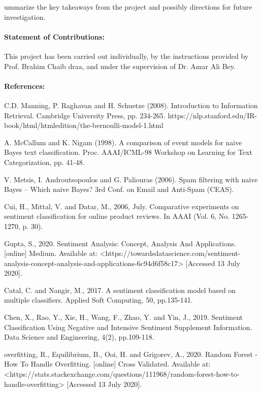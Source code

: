 \documentclass[12pt]{report}
\begin{document}
	
	
	
	ummarize the key takeaways from the project
	and possibly directions for future investigation.
	
	
	\paragraph{Statement of Contributions:}
	This project has been carried out individually, by the instructions provided by Prof. Brahim Chaib draa, and under the supervision of Dr. Amar Ali Bey.\\
	
	
	\paragraph{References:}
	C.D. Manning, P. Raghavan and H. Schuetze (2008). Introduction to Information Retrieval. Cambridge University Press, pp. 234-265. https://nlp.stanford.edu/IR-book/html/htmledition/the-bernoulli-model-1.html
	
	A. McCallum and K. Nigam (1998). A comparison of event models for naive Bayes text classification. Proc. AAAI/ICML-98 Workshop on Learning for Text Categorization, pp. 41-48.
	
	V. Metsis, I. Androutsopoulos and G. Paliouras (2006). Spam filtering with naive Bayes – Which naive Bayes? 3rd Conf. on Email and Anti-Spam (CEAS).
	
	Cui, H., Mittal, V. and Datar, M., 2006, July. Comparative experiments on sentiment classification for online product reviews. In AAAI (Vol. 6, No. 1265-1270, p. 30).
	
	Gupta, S., 2020. Sentiment Analysis: Concept, Analysis And Applications. [online] Medium. Available at: <https://towardsdatascience.com/sentiment-analysis-concept-analysis-and-applications-6c94d6f58c17> [Accessed 13 July 2020].
	
	Catal, C. and Nangir, M., 2017. A sentiment classification model based on multiple classifiers. Applied Soft Computing, 50, pp.135-141.
	
	Chen, X., Rao, Y., Xie, H., Wang, F., Zhao, Y. and Yin, J., 2019. Sentiment Classification Using Negative and Intensive Sentiment Supplement Information. Data Science and Engineering, 4(2), pp.109-118.
	
	overfitting, R., Equilibrium, B., Ooi, H. and Grigorev, A., 2020. Random Forest - How To Handle Overfitting. [online] Cross Validated. Available at: <https://stats.stackexchange.com/questions/111968/random-forest-how-to-handle-overfitting> [Accessed 13 July 2020].
	
	
\end{document}
